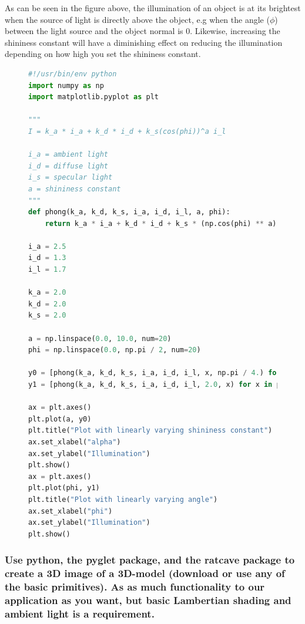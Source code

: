 \documentclass[a4paper, titlepage,12pt]{article}
\begin{document}
	As can be seen in the figure above, the illumination of an object is at its brightest when the source of light is directly above the object, e.g when the angle ($\phi$) between the light source and the object normal is 0. Likewise, increasing the shininess constant will have a diminishing effect on reducing the illumination depending on how high you set the shininess constant.

	\begin{figure}[H]
		\begin{center}
			\begin{lstlisting}[language=Python]
#!/usr/bin/env python
import numpy as np
import matplotlib.pyplot as plt

"""
I = k_a * i_a + k_d * i_d + k_s(cos(phi))^a i_l

i_a = ambient light
i_d = diffuse light
i_s = specular light
a = shininess constant
"""
def phong(k_a, k_d, k_s, i_a, i_d, i_l, a, phi):
    return k_a * i_a + k_d * i_d + k_s * (np.cos(phi) ** a) * i_l

i_a = 2.5
i_d = 1.3
i_l = 1.7

k_a = 2.0
k_d = 2.0
k_s = 2.0

a = np.linspace(0.0, 10.0, num=20)
phi = np.linspace(0.0, np.pi / 2, num=20)

y0 = [phong(k_a, k_d, k_s, i_a, i_d, i_l, x, np.pi / 4.) for x in a]
y1 = [phong(k_a, k_d, k_s, i_a, i_d, i_l, 2.0, x) for x in phi]

ax = plt.axes()
plt.plot(a, y0)
plt.title("Plot with linearly varying shininess constant")
ax.set_xlabel("alpha")
ax.set_ylabel("Illumination")
plt.show()
ax = plt.axes()
plt.plot(phi, y1)
plt.title("Plot with linearly varying angle")
ax.set_xlabel("phi")
ax.set_ylabel("Illumination")
plt.show()
			\end{lstlisting}
		\end{center}
	\end{figure}

	\subsubsection*{Use python, the pyglet package, and the ratcave package to create a 3D image of a 3D-model (download or use any of the basic primitives). As as much functionality to our application as you want, but basic Lambertian shading and ambient light is a requirement.}
\end{document}
